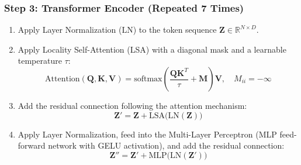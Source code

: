 \documentclass[12pt,a4paper]{report}
\renewcommand{\textbf}[1]{#1}
\begin{document}
\subsubsection*{Step 3: Transformer Encoder (Repeated 7 Times)}
\begin{enumerate}
  \item[\textbf{3.1}] Apply Layer Normalization ($\mathrm{LN}$) to the token sequence $\mathbf{Z} \in \mathbb{R}^{N \times D}$.
  \item[\textbf{3.2}] Apply Locality Self-Attention (LSA) with a diagonal mask and a learnable temperature $\tau$:
    \begin{equation}
      \mathrm{Attention}(\mathbf{Q}, \mathbf{K}, \mathbf{V}) = \mathrm{softmax}\left( \frac{\mathbf{Q}\mathbf{K}^T}{\tau} + \mathbf{M} \right) \mathbf{V}, \quad M_{ii} = -\infty
    \end{equation}
  \item[\textbf{3.3}] Add the residual connection following the attention mechanism:
    \begin{equation}
      \mathbf{Z}' = \mathbf{Z} + \mathrm{LSA}\big( \mathrm{LN}(\mathbf{Z}) \big)
    \end{equation}
  \item[\textbf{3.4}] Apply Layer Normalization, feed into the Multi-Layer Perceptron (MLP feed-forward network with GELU activation), and add the residual connection:
    \begin{equation}
      \mathbf{Z}'' = \mathbf{Z}' + \mathrm{MLP}\big( \mathrm{LN}(\mathbf{Z}') \big)
    \end{equation}
\end{enumerate}
\end{document}

